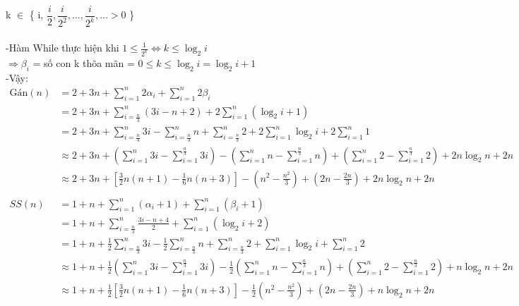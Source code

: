 \documentclass[12pt, letterpaper]{article}
\begin{document}
     k $\in$ \{ i, $\dfrac{i}{2}, \dfrac{i}{2^2}, \ldots, \dfrac{i}{2^k}, \ldots >0$ \} \\ \\
	-Hàm While thực hiện khi $1 \leq \frac{1}{2^k}  \Leftrightarrow k \leq \log_2 i$\\  
	$\Rightarrow \beta_i$ = số \space con k thõa mãn = $0 \leq k \leq \log_2 i = \log_2 i+1$\\
	-Vậy: \\
	$ \begin{aligned}
		\text{Gán}(n) & = 2 + 3n + \sum^{n}_{i = 1} 2 \alpha_i  + \sum^{n}_{i = 1} 2 \beta_i\\
			& = 2 + 3n + \sum^{n}_{i = \frac{n}{3}} (3i -n + 2) + 2 \sum^{n}_{i = 1}(\log_2 i+1)\\
			& = 2 + 3n + \sum^{n}_{i = \frac{n}{3}} 3i - \sum^{n}_{i = \frac{n}{3}} n + \sum^{n}_{i = \frac{n}{3}} 2 + 2 \sum^{n}_{i = 1}\log_2 i + 2 \sum^{n}_{i = 1}1\\
			& \approx 2 + 3n + (\sum^{n}_{i = 1} 3i - \sum^{\frac{n}{3}}_{i = 1} 3i) - (\sum^{n}_{i = 1} n - \sum^{\frac{n}{3}}_{i = 1} n) + (\sum^{n}_{i = 1} 2 - \sum^{\frac{n}{3}}_{i = 1} 2) + 2n \log_2n + 2n \\
			& \approx 2 + 3n + [\frac{3}{2}n(n + 1) - \frac{1}{6}n(n + 3)] - (n^2 - \frac{n^2}{3}) + (2n - \frac{2n}{3}) + 2n \log_2n + 2n \\
			\\SS(n) & = 1 + n + \sum^{n}_{i = 1} (\alpha_i  + 1) + \sum^{n}_{i = 1} ( \beta_i + 1)\\
			& = 1 + n + \sum^{n}_{i = \frac{n}{3}} \frac{3i - n + 4}{2} + \sum^{n}_{i = 1} (\log_2 i + 2)\\
			& = 1 + n + \frac{1}{2}\sum^{n}_{i = \frac{n}{3}} 3i - \frac{1}{2}\sum^{n}_{i = \frac{n}{3}} n + \sum^{n}_{i = \frac{n}{3}} 2 + \sum^{n}_{i = 1} \log_2 i + \sum^{n}_{i = 1} 2\\
			& \approx 1 + n + \frac{1}{2}(\sum^{n}_{i = 1} 3i - \sum^{\frac{n}{3}}_{i = 1} 3i) - \frac{1}{2}(\sum^{n}_{i = 1} n - \sum^{\frac{n}{3}}_{i = 1} n) + (\sum^{n}_{i = 1} 2 - \sum^{\frac{n}{3}}_{i = 1} 2) + n \log_2n + 2n \\
			& \approx 1 + n + \frac{1}{2}[\frac{3}{2}n(n + 1) - \frac{1}{6}n(n + 3)] - \frac{1}{2}(n^2 - \frac{n^2}{3}) + (2n - \frac{2n}{3}) + n \log_2n + 2n \\
	\end{aligned} $ \\
\end{document}
